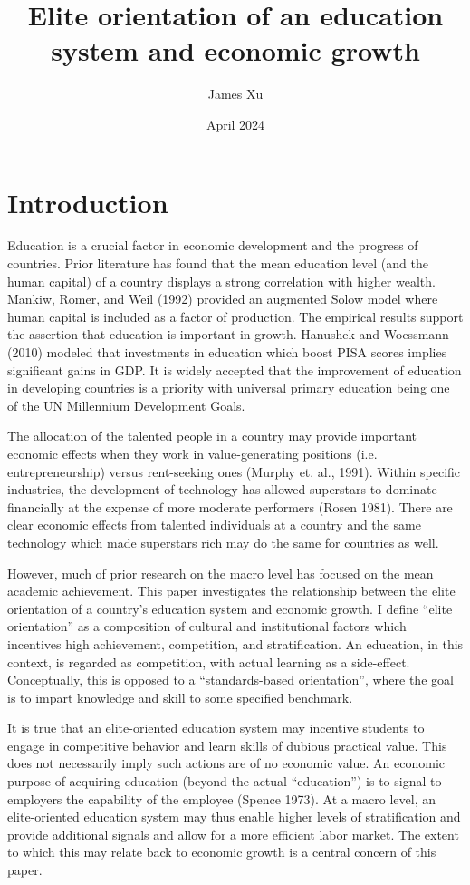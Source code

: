 \documentclass[11pt]{article}
\title{Elite orientation of an education system and economic growth}
\author{James Xu}
\date{April 2024}
\begin{document}
\maketitle

\section{Introduction}
Education is a crucial factor in economic development and the progress of countries. Prior literature has found that the mean education level (and the human capital) of a country displays a strong correlation with higher wealth. Mankiw, Romer, and Weil (1992) provided an augmented Solow model where human capital is included as a factor of production. The empirical results support the assertion that education is important in growth. Hanushek and Woessmann (2010) modeled that investments in education which boost PISA scores implies significant gains in GDP. It is widely accepted that the improvement of education in developing countries is a priority with universal primary education being one of the UN Millennium Development Goals.

The allocation of the talented people in a country may provide important economic effects when they work in value-generating positions (i.e. entrepreneurship) versus rent-seeking ones (Murphy et. al., 1991). Within specific industries, the development of technology has allowed superstars to dominate financially at the expense of more moderate performers (Rosen 1981). There are clear economic effects from talented individuals at a country and the same technology which made superstars rich may do the same for countries as well.

However, much of prior research on the macro level has focused on the mean academic achievement. This paper investigates the relationship between the elite orientation of a country’s education system and economic growth. I define “elite orientation” as a composition of cultural and institutional factors which incentives high achievement, competition, and stratification. An education, in this context, is regarded as competition, with actual learning as a side-effect. Conceptually, this is opposed to a “standards-based orientation”, where the goal is to impart knowledge and skill to some specified benchmark.

It is true that an elite-oriented education system may incentive students to engage in competitive behavior and learn skills of dubious practical value. This does not necessarily imply such actions are of no economic value. An economic purpose of acquiring education (beyond the actual “education”) is to signal to employers the capability of the employee (Spence 1973). At a macro level, an elite-oriented education system may thus enable higher levels of stratification and provide additional signals and allow for a more efficient labor market. The extent to which this may relate back to economic growth is a central concern of this paper.
\end{document}
